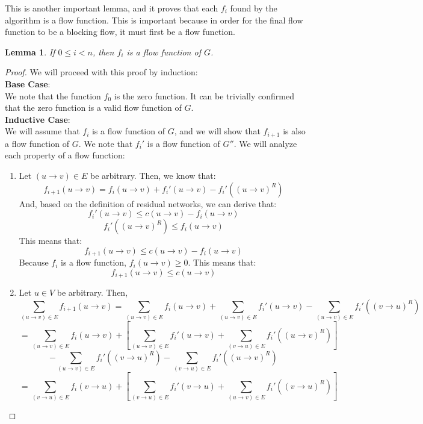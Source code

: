 \documentclass{report}
\newtheorem{lemma}{Lemma}[section]
\begin{document}
This is another important lemma, and it proves that each $f_i$ found by the algorithm is a flow function. This is important because in order for the final flow function to be a blocking flow, it must first be a flow function.
\begin{lemma}
    If $0 \le i < n$, then $f_i$ is a flow function of $G$.
\end{lemma}
\begin{proof}
    We will proceed with this proof by induction:\\
    \textbf{Base Case}:\\
    We note that the function $f_0$ is the zero function. It can be trivially confirmed that the zero function is a valid flow function of $G$.\\
    \textbf{Inductive Case}:\\
    We will assume that $f_i$ is a flow function of $G$, and we will show that $f_{i+1}$ is also a flow function of $G$. We note that $f_i'$ is a flow function of $G''$. We will analyze each property of a flow function:
    \begin{enumerate}
        \item
            Let $(u \rightarrow v) \in E$ be arbitrary. Then, we know that:
            $$f_{i+1}(u \rightarrow v) = f_i(u \rightarrow v) + f_i'(u \rightarrow v) - f_i'((u \rightarrow v)^R)$$
            And, based on the definition of residual networks, we can derive that:
            $$f_i'(u \rightarrow v) \le c(u \rightarrow v) - f_i(u \rightarrow v)$$
            $$f_i'((u \rightarrow v)^R) \le f_i(u \rightarrow v)$$
            This means that:
            $$f_{i+1}(u \rightarrow v) \le c(u \rightarrow v) - f_i(u \rightarrow v)$$
            Because $f_i$ is a flow function, $f_i(u \rightarrow v) \ge 0$. This means that:
            $$f_{i+1}(u \rightarrow v) \le c(u \rightarrow v)$$
        \item
            Let $u \in V$ be arbitrary. Then,
            $$\sum_{(u \rightarrow v) \in E}f_{i+1}(u \rightarrow v) = \sum_{(u \rightarrow v) \in E}f_i(u \rightarrow v) + \sum_{(u \rightarrow v) \in E}f_i'(u \rightarrow v) - \sum_{(u \rightarrow v) \in E}f_i'((v \rightarrow u)^R)$$
            $$=\sum_{(u \rightarrow v) \in E}f_i(u \rightarrow v) + \left[ \sum_{(u \rightarrow v) \in E}f_i'(u \rightarrow v) + \sum_{(v \rightarrow u) \in E}f_i'((u \rightarrow v)^R) \right]$$
            $$- \sum_{(u \rightarrow v) \in E}f_i'((v \rightarrow u)^R) - \sum_{(v \rightarrow u) \in E}f_i'((u \rightarrow v)^R)$$
            $$=\sum_{(v \rightarrow u) \in E}f_i(v \rightarrow u) + \left[ \sum_{(v \rightarrow u) \in E}f_i'(v \rightarrow u) + \sum_{(u \rightarrow v) \in E}f_i'((v \rightarrow u)^R) \right]$$

\end{enumerate}
\end{proof}
\end{document}
